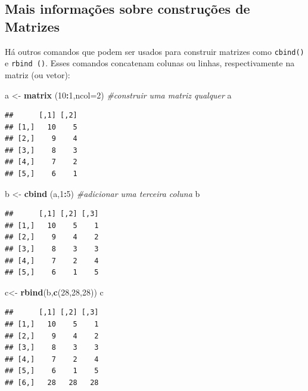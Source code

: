\documentclass[
]{book}
\newenvironment{Shaded}{\begin{snugshade}}{\end{snugshade}}
\newcommand{\CommentTok}[1]{\textcolor[rgb]{0.56,0.35,0.01}{\textit{#1}}}
\newcommand{\DataTypeTok}[1]{\textcolor[rgb]{0.13,0.29,0.53}{#1}}
\newcommand{\DecValTok}[1]{\textcolor[rgb]{0.00,0.00,0.81}{#1}}
\newcommand{\KeywordTok}[1]{\textcolor[rgb]{0.13,0.29,0.53}{\textbf{#1}}}
\newcommand{\NormalTok}[1]{#1}
\newcommand{\OperatorTok}[1]{\textcolor[rgb]{0.81,0.36,0.00}{\textbf{#1}}}
\newcommand{\StringTok}[1]{\textcolor[rgb]{0.31,0.60,0.02}{#1}}
\begin{document}
\hypertarget{mais-informauxe7uxf5es-sobre-construuxe7uxf5es-de-matrizes}{%
\subsection{Mais informações sobre construções de Matrizes}\label{mais-informauxe7uxf5es-sobre-construuxe7uxf5es-de-matrizes}}

Há outros comandos que podem ser usados para construir matrizes como \texttt{cbind()} e \texttt{rbind\ ()}. Esses comandos concatenam colunas ou linhas, respectivamente na matriz (ou vetor):

\begin{Shaded}
\begin{Highlighting}[]
\NormalTok{a <-}\StringTok{ }\KeywordTok{matrix}\NormalTok{ (}\DecValTok{10}\OperatorTok{:}\DecValTok{1}\NormalTok{,}\DataTypeTok{ncol=}\DecValTok{2}\NormalTok{) }\CommentTok{#construir uma matriz qualquer}
\NormalTok{a}
\end{Highlighting}
\end{Shaded}

\begin{verbatim}
##      [,1] [,2]
## [1,]   10    5
## [2,]    9    4
## [3,]    8    3
## [4,]    7    2
## [5,]    6    1
\end{verbatim}

\begin{Shaded}
\begin{Highlighting}[]
\NormalTok{b <-}\StringTok{ }\KeywordTok{cbind}\NormalTok{ (a,}\DecValTok{1}\OperatorTok{:}\DecValTok{5}\NormalTok{) }\CommentTok{#adicionar uma terceira coluna}
\NormalTok{b}
\end{Highlighting}
\end{Shaded}

\begin{verbatim}
##      [,1] [,2] [,3]
## [1,]   10    5    1
## [2,]    9    4    2
## [3,]    8    3    3
## [4,]    7    2    4
## [5,]    6    1    5
\end{verbatim}

\begin{Shaded}
\begin{Highlighting}[]
\NormalTok{c<-}\StringTok{ }\KeywordTok{rbind}\NormalTok{(b,}\KeywordTok{c}\NormalTok{(}\DecValTok{28}\NormalTok{,}\DecValTok{28}\NormalTok{,}\DecValTok{28}\NormalTok{))}
\NormalTok{c}
\end{Highlighting}
\end{Shaded}

\begin{verbatim}
##      [,1] [,2] [,3]
## [1,]   10    5    1
## [2,]    9    4    2
## [3,]    8    3    3
## [4,]    7    2    4
## [5,]    6    1    5
## [6,]   28   28   28
\end{verbatim}
\end{document}
